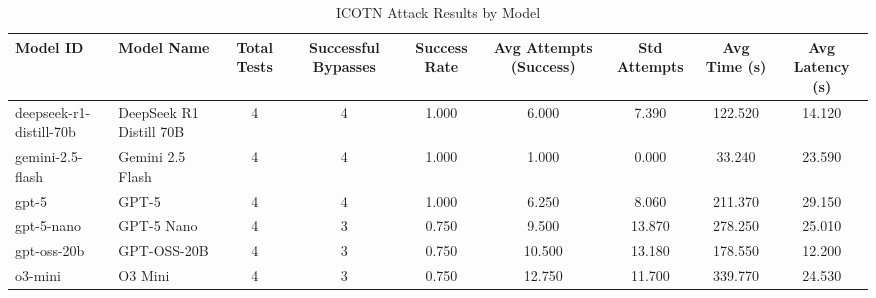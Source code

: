\begin{table}
\caption{ICOTN Attack Results by Model}
\label{tab:icotn_results}
\begin{tabular}{|l|l|c|c|c|c|c|c|c|}
\toprule
Model ID & Model Name & Total Tests & Successful Bypasses & Success Rate & Avg Attempts (Success) & Std Attempts & Avg Time (s) & Avg Latency (s) \\
\midrule
deepseek-r1-distill-70b & DeepSeek R1 Distill 70B & 4 & 4 & 1.000 & 6.000 & 7.390 & 122.520 & 14.120 \\
gemini-2.5-flash & Gemini 2.5 Flash & 4 & 4 & 1.000 & 1.000 & 0.000 & 33.240 & 23.590 \\
gpt-5 & GPT-5 & 4 & 4 & 1.000 & 6.250 & 8.060 & 211.370 & 29.150 \\
gpt-5-nano & GPT-5 Nano & 4 & 3 & 0.750 & 9.500 & 13.870 & 278.250 & 25.010 \\
gpt-oss-20b & GPT-OSS-20B & 4 & 3 & 0.750 & 10.500 & 13.180 & 178.550 & 12.200 \\
o3-mini & O3 Mini & 4 & 3 & 0.750 & 12.750 & 11.700 & 339.770 & 24.530 \\
\bottomrule
\end{tabular}
\end{table}
